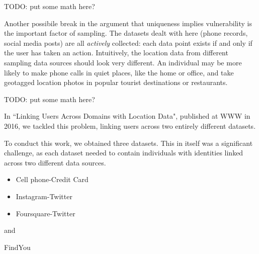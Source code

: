 TODO: put some math here?

Another possibile break in the argument that uniqueness implies vulnerability is the important factor of sampling.
The datasets dealt with here (phone records, social media posts) are all \emph{actively} collected: each data point exists if and only if the user has taken an action.
Intuitively, the location data from different sampling data sources should look very different.
An individual may be more likely to make phone calls in quiet places, like the home or office, and take geotagged location photos in popular tourist destinations or restaurants.

TODO: put some math here?

In ``Linking Users Across Domains with Location Data", published at WWW in 2016, we tackled this problem, linking users across two entirely different datasets.


To conduct this work, we obtained three datasets.
This in itself was a significant challenge, as each dataset needed to contain individuals with identities linked across two different data sources.
\begin{itemize}
  \item Cell phone-Credit Card
  \item Instagram-Twitter
  \item Foursquare-Twitter
\end{itemize}



and

FindYou
